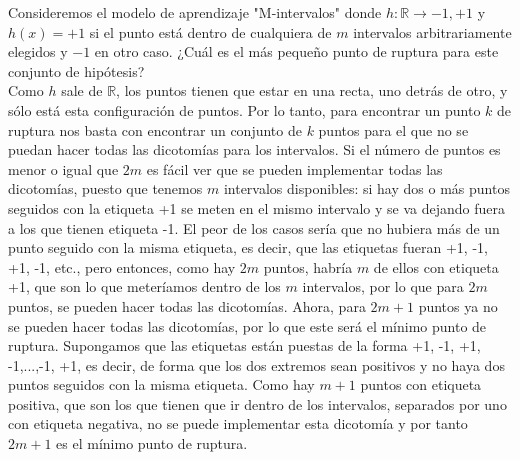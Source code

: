 \documentclass[12pt]{article}
\theoremstyle{definition}
\begin{document}
\begin{pregunta}
Consideremos el modelo de aprendizaje "M-intervalos" \textit{ }donde $h: \mathbb{R} \rightarrow {-1, +1}$ y $h(x)=+1$ si el punto está dentro de cualquiera de $m$ intervalos arbitrariamente elegidos y $-1$ en otro caso. ¿Cuál es el más pequeño punto de ruptura para este conjunto de hipótesis?\\

Como $h$ sale de $\mathbb{R}$, los puntos tienen que estar en una recta, uno detrás de otro, y sólo está esta configuración de puntos. Por lo tanto, para encontrar un punto $k$ de ruptura nos basta con encontrar un conjunto de $k$ puntos para el que no se puedan hacer todas las dicotomías para los intervalos. Si el número de puntos es menor o igual que $2m$ es fácil ver que se pueden implementar todas las dicotomías, puesto que tenemos $m$ intervalos disponibles: si hay dos o más puntos seguidos con la etiqueta +1 se meten en el mismo intervalo y se va dejando fuera a los que tienen etiqueta -1. El peor de los casos sería que no hubiera más de un punto seguido con la misma etiqueta, es decir, que las etiquetas fueran +1, -1, +1, -1, etc., pero entonces, como hay $2m$ puntos, habría $m$ de ellos con etiqueta +1, que son lo que meteríamos dentro de los $m$ intervalos, por lo que para $2m$ puntos, se pueden hacer todas las dicotomías. Ahora, para $2m+1$ puntos ya no se pueden hacer todas las dicotomías, por lo que este será el mínimo punto de ruptura. Supongamos que las etiquetas están puestas de la forma +1, -1, +1, -1,...,-1, +1, es decir, de forma que los dos extremos sean positivos y no haya dos puntos seguidos con la misma etiqueta. Como hay $m+1$ puntos con etiqueta positiva, que son los que tienen que ir dentro de los intervalos, separados por uno con etiqueta negativa, no se puede implementar esta dicotomía y por tanto $2m+1$ es el mínimo punto de ruptura.
\end{pregunta}
\end{document}
